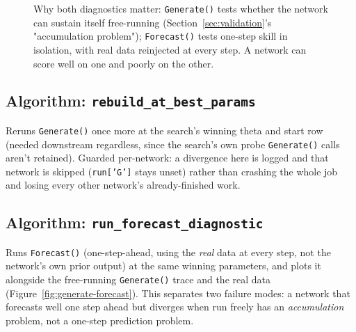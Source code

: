 \documentclass[11pt]{article}
\begin{document}
\begin{figure}[H]
\centering
{}
\caption{Why both diagnostics matter: \texttt{Generate()} tests whether the network can sustain itself free-running (Section~\ref{sec:validation}'s "accumulation problem"); \texttt{Forecast()} tests one-step skill in isolation, with real data reinjected at every step. A network can score well on one and poorly on the other.}
\label{fig:generate-vs-forecast}
\end{figure}

\subsection{Algorithm: \texttt{rebuild\_at\_best\_params}}
Reruns \texttt{Generate()} once more at the search's winning theta and start row (needed downstream regardless, since the search's own probe \texttt{Generate()} calls aren't retained). Guarded per-network: a divergence here is logged and that network is skipped (\texttt{run['G']} stays unset) rather than crashing the whole job and losing every other network's already-finished work.

\subsection{Algorithm: \texttt{run\_forecast\_diagnostic}}
Runs \texttt{Forecast()} (one-step-ahead, using the \emph{real} data at every step, not the network's own prior output) at the same winning parameters, and plots it alongside the free-running \texttt{Generate()} trace and the real data (Figure~\ref{fig:generate-forecast}). This separates two failure modes: a network that forecasts well one step ahead but diverges when run freely has an \emph{accumulation} problem, not a one-step prediction problem.
\end{document}
